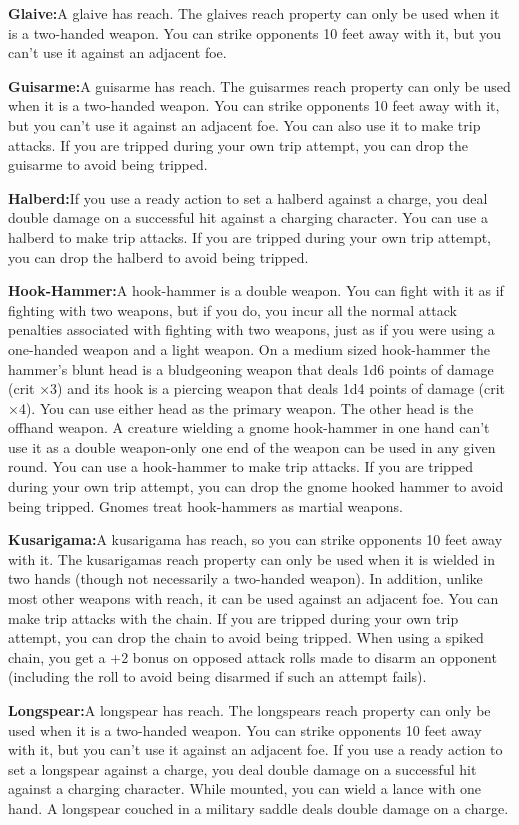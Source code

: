\textbf{Glaive:}{A glaive has reach. The glaives reach property can only be used when it is a two-handed weapon. You can strike opponents 10 feet away with it, but you can't use it against an adjacent foe.}

\textbf{Guisarme:}{A guisarme has reach. The guisarmes reach property can only be used when it is a two-handed weapon. You can strike opponents 10 feet away with it, but you can't use it against an adjacent foe. You can also use it to make trip attacks. If you are tripped during your own trip attempt, you can drop the guisarme to avoid being tripped.}

\textbf{Halberd:}{If you use a ready action to set a halberd against a charge, you deal double damage on a successful hit against a charging character. You can use a halberd to make trip attacks. If you are tripped during your own trip attempt, you can drop the halberd to avoid being tripped.}

\textbf{Hook-Hammer:}{A hook-hammer is a double weapon. You can fight with it as if fighting with two weapons, but if you do, you incur all the normal attack penalties associated with fighting with two weapons, just as if you were using a one-handed weapon and a light weapon. On a medium sized hook-hammer the hammer's blunt head is a bludgeoning weapon that deals 1d6 points of damage (crit ×3) and its hook is a piercing weapon that deals 1d4 points of damage (crit ×4). You can use either head as the primary weapon. The other head is the offhand weapon. A creature wielding a gnome hook-hammer in one hand can't use it as a double weapon-only one end of the weapon can be used in any given round. You can use a hook-hammer to make trip attacks. If you are tripped during your own trip attempt, you can drop the gnome hooked hammer to avoid being tripped. Gnomes treat hook-hammers as martial weapons.}

\textbf{Kusarigama:}{A kusarigama has reach, so you can strike opponents 10 feet away with it. The kusarigamas reach property can only be used when it is wielded in two hands (though not necessarily a two-handed weapon). In addition, unlike most other weapons with reach, it can be used against an adjacent foe. You can make trip attacks with the chain. If you are tripped during your own trip attempt, you can drop the chain to avoid being tripped. When using a spiked chain, you get a +2 bonus on opposed attack rolls made to disarm an opponent (including the roll to avoid being disarmed if such an attempt fails).}

\textbf{Longspear:}{A longspear has reach. The longspears reach property can only be used when it is a two-handed weapon. You can strike opponents 10 feet away with it, but you can't use it against an adjacent foe. If you use a ready action to set a longspear against a charge, you deal double damage on a successful hit against a charging character. While mounted, you can wield a lance with one hand. A longspear couched in a military saddle deals double damage on a charge.}

